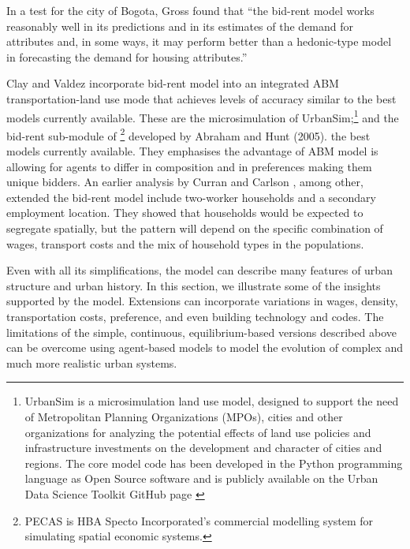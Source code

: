 In a test for the city of Bogota, Gross \cite{grossEstimatingWillingnessPay1988} found that  ``the bid-rent model works reasonably well in its predictions and in its estimates of the demand for attributes and, in some ways, it may perform better than a hedonic-type model in forecasting the demand for housing attributes.'' 

Clay and Valdez incorporate bid-rent model into an integrated ABM transportation-land use mode that achieves levels of accuracy similar to the best models currently available. These are the microsimulation of UrbanSim;\footnote{UrbanSim is a microsimulation land use model, designed to support the need of Metropolitan Planning Organizations (MPOs), cities and other organizations for analyzing the potential effects of land use policies and infrastructure investments on the development and character of cities and regions. The core model code has been developed in the Python programming language as Open Source software and is publicly available on the Urban Data Science Toolkit GitHub page \cite{waddellmodellinurbandev2002}} and the bid-rent sub-module of \footnote{PECAS is  HBA Specto Incorporated's commercial modelling system  for simulating spatial economic systems.} developed by Abraham and Hunt (2005). the best models currently available. They emphasises the advantage of ABM model is allowing for agents to differ in composition and in preferences making them unique bidders. 
An earlier analysis by Curran and Carlson \cite{curranTheoryResidentialLocation1982}, among other, extended the bid-rent model include two-worker households and a secondary employment location. They showed that households would be expected to segregate spatially, but the pattern will depend on the specific combination of wages, transport costs and the mix of household types in the populations. 

Even with all its simplifications, the model can describe many features of urban structure and urban history. In this section, we illustrate some of the insights supported by the model. Extensions can incorporate variations in wages, density, transportation costs, preference, and even building technology and codes. The limitations of the simple, continuous, equilibrium-based versions described above can be overcome using agent-based models to model the evolution of complex and much more realistic urban systems. 






